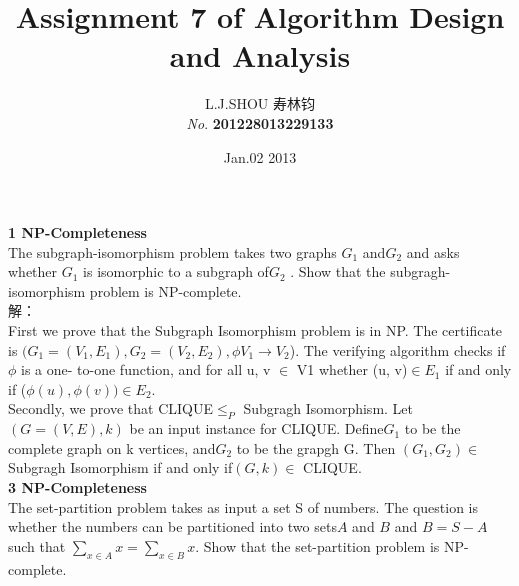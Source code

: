 \documentclass[11pt]{article}
\begin{document}
\begin{CJK}{UTF8}{gkai}
\title{ \textbf{Assignment 7 of Algorithm Design and Analysis}}
\author{L.J.SHOU  寿林钧\\{\slshape No}. \bf 201228013229133}
\date{Jan.02 2013}
\maketitle %
\noindent
{\bf \large  1 NP-Completeness}\\[2mm]
The subgraph-isomorphism problem takes two graphs $G_1$ and$ G_2$ and asks
whether $G_1$ is isomorphic to a subgraph of$ G_2$ . Show that the subgragh-
isomorphism problem is NP-complete.\\
解：\\
First we prove that the Subgraph Isomorphism problem is in NP. 
The certificate is $(G_1=(V_1,E_1), G_2 = (V_2,E_2),\phi V_1\rightarrow V_2$). The verifying algorithm checks if $\phi$ is a one-
to-one function, and for all u, v $\in$ V1 whether (u, v)$\in E_1$ if and only if ($\phi(u),\phi(v))\in E_2$.\\
Secondly, we prove that CLIQUE$\leq_P$ Subgragh Isomorphism. Let$ (G = (V,E),k)$ be
an input instance for CLIQUE. Define$ G_1$ to be the complete graph on k vertices, and$ G_2$
to be the grapgh G. Then $(G_1,G_2)\in$ Subgragh Isomorphism if and only if$ (G, k)\in$ 
CLIQUE.\\

\noindent
{\bf \large  3 NP-Completeness}\\[2mm]
The set-partition problem takes as input a set S of numbers. The question is whether
the numbers can be partitioned into two sets$A$ and $B$ and $B = S − A$ such that $\sum_{x\in A}x =
\sum_{x\in B}x$. Show that the set-partition problem is NP-complete.\\


\end{CJK}
\end{document}

